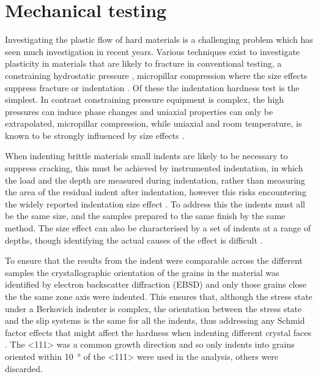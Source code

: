 


\section{Mechanical testing}
\label{sec:Ti2Ni_mechtesting}

Investigating the plastic flow of hard materials is a challenging problem which has seen much investigation in recent years. Various techniques exist to investigate plasticity in materials that are likely to fracture in conventional testing, a constraining hydrostatic pressure \cite{Griggs1936,Weinrich1975,Borvin1990}, micropillar compression where the size effects suppress fracture \cite{Uchic2004} or indentation \cite{Cripps2011,tabor2000hardness,Marsh1964,Korte2009}. Of these the indentation hardness test is the simplest. In contrast constraining pressure equipment is complex, the high pressures can induce phase changes and uniaxial properties can only be extrapolated, micropillar compression, while uniaxial and room temperature, is known to be strongly influenced by size effects \cite{Uchic2004,Greer2005,Greer2006corrigendum}.


When indenting brittle materials small indents are likely to be necessary to suppress cracking, this must be achieved by instrumented indentation, in which the load and the depth are measured during indentation, rather than measuring the area of the residual indent after indentation, however this risks encountering the widely reported indentation size effect \cite{Korte2009,Cripps2011}. To address this the indents must all be the same size, and the samples prepared to the same finish by the same method. The size effect can also be characterised by a set of indents at a range of depths, though identifying the actual causes of the effect is difficult \cite{Korte2009,Cripps2011}.


To ensure that the results from the indent were comparable across the different samples the crystallographic orientation of the grains in the material was identified by electron backscatter diffraction (EBSD) \cite{Alam1954} and only those grains close the the same zone axis were indented. This ensures that, although the stress state under a Berkovich indenter is complex, the orientation between the stress state and the slip systems is the same for all the indents, thus addressing any Schmid factor effects that might affect the hardness when indenting different crystal faces \cite{Kelly2012ch7}. The <111> was a common growth direction and so only indents into grains oriented within \SI{10}{\degree} of the <111> were used in the analysis, others were discarded.


